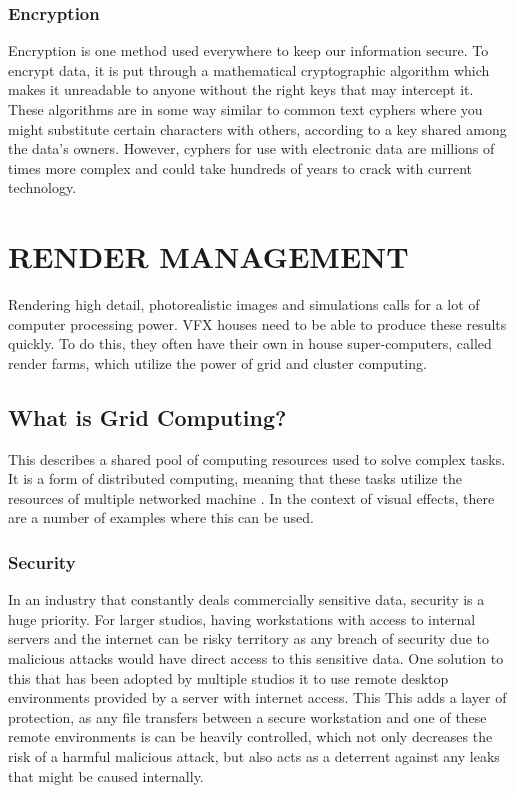 \hypertarget{encryption}{%
\subsubsection{Encryption}\label{encryption}}

Encryption is one method used everywhere to keep our information secure. To encrypt data, it is put through a mathematical cryptographic algorithm which makes it unreadable to anyone without the right keys that may intercept it. These algorithms are in some way similar to common text cyphers where you might substitute certain characters with others, according to a key shared among the data's owners. However, cyphers for use with electronic data are millions of times more complex and could take hundreds of years to crack with current technology.

\pagebreak\hypertarget{render-management}{%
\section{RENDER MANAGEMENT}\label{render-management}}

Rendering high detail, photorealistic images and simulations calls for a lot of computer processing power. VFX houses need to be able to produce these results quickly. To do this, they often have their own in house super-computers, called render farms, which utilize the power of grid and cluster computing.

\hypertarget{what-is-grid-computing}{%
\subsection{What is Grid Computing?}\label{what-is-grid-computing}}

This describes a shared pool of computing resources used to solve complex tasks. It is a form of distributed computing, meaning that these tasks utilize the resources of multiple networked machine . In the context of visual effects, there are a number of examples where this can be used.

\hypertarget{security}{%
\subsubsection{Security}\label{security}}

In an industry that constantly deals commercially sensitive data, security is a huge priority. For larger studios, having workstations with access to internal servers and the internet can be risky territory as any breach of security due to malicious attacks would have direct access to this sensitive data. One solution to this that has been adopted by multiple studios it to use remote desktop environments provided by a server with internet access. This This adds a layer of protection, as any file transfers between a secure workstation and one of these remote environments is can be heavily controlled, which not only decreases the risk of a harmful malicious attack, but also acts as a deterrent against any leaks that might be caused internally.


